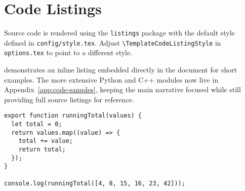 \section{Code Listings}

Source code is rendered using the \texttt{listings} package with the default style defined in \texttt{config/style.tex}. Adjust \texttt{\textbackslash TemplateCodeListingStyle} in \texttt{options.tex} to point to a different style.

 demonstrates an inline listing embedded directly in the document for short examples. The more extensive Python and C++ modules now live in Appendix~\ref{app:code-samples}, keeping the main narrative focused while still providing full source listings for reference.

\begin{lstlisting}[style=githubJavaScript, caption={Running total helper implemented in modern JavaScript.}, label={lst:js-running-total}]
export function runningTotal(values) {
  let total = 0;
  return values.map((value) => {
    total += value;
    return total;
  });
}

console.log(runningTotal([4, 8, 15, 16, 23, 42]));
\end{lstlisting}
